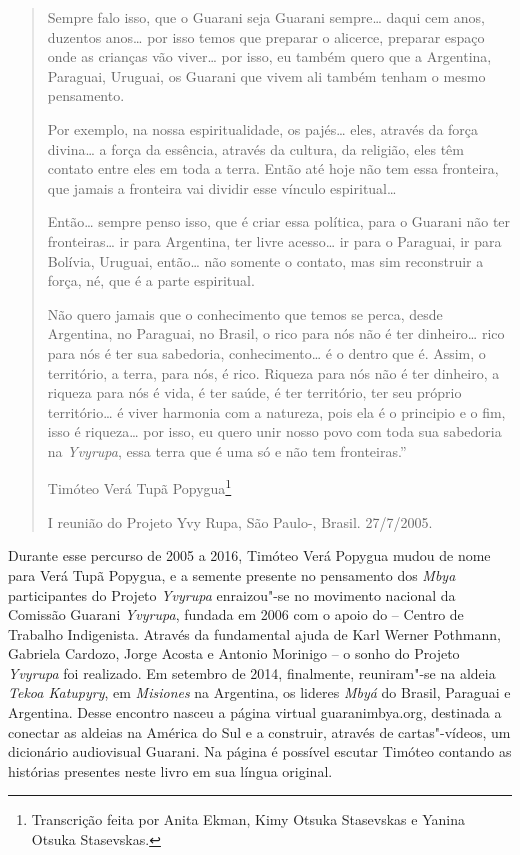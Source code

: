 \begin{quote}
Sempre falo isso, que o Guarani seja Guarani sempre… daqui cem
anos, duzentos anos… por isso temos que preparar o alicerce,
preparar espaço onde as crianças vão viver… por isso, eu também
quero que a Argentina, Paraguai, Uruguai, os Guarani que vivem ali
também tenham o mesmo pensamento.

Por exemplo, na nossa espiritualidade, os pajés… eles, através da
força divina… a força da essência, através da cultura, da
religião, eles têm contato entre eles em toda a terra. Então até hoje
não tem essa fronteira, que jamais a fronteira vai dividir esse vínculo
espiritual…

Então… sempre penso isso, que é criar essa política, para o
Guarani não ter fronteiras… ir para Argentina, ter livre
acesso… ir para o Paraguai, ir para Bolívia, Uruguai,
então… não somente o contato, mas sim reconstruir a força, né,
que é a parte espiritual.

Não quero jamais que o conhecimento que temos se perca, desde Argentina,
no Paraguai, no Brasil, o rico para nós não é ter dinheiro… rico
para nós é ter sua sabedoria, conhecimento… é o dentro que é.
Assim, o território, a terra, para nós, é rico. Riqueza para nós não é
ter dinheiro, a riqueza para nós é vida, é ter saúde, é ter território,
ter seu próprio território… é viver harmonia com a natureza, pois
ela é o principio e o fim, isso é riqueza… por isso, eu quero
unir nosso povo com toda sua sabedoria na \emph{Yvyrupa}, essa terra que
é uma só e não tem fronteiras.''

\medskip 
\hfill Timóteo Verá Tupã Popygua\footnote{ Transcrição feita por Anita Ekman, Kimy Otsuka Stasevskas e Yanina
Otsuka Stasevskas.}\smallskip 

\hfill \begin{minipage}{.6\textwidth}\footnotesize
I reunião do {Projeto Yvy Rupa}, São Paulo-,
Brasil. 27/7/2005. 
\end{minipage}

\end{quote}

 

Durante esse percurso de 2005 a 2016, Timóteo Verá Popygua mudou de nome
para Verá Tupã Popygua, e a semente presente no pensamento
dos \emph{Mbya} participantes
do {Projeto }\emph{{Yvyrupa}} enraizou"-se no movimento
nacional da {Comissão Guarani }\emph{{Yvyrupa}}, fundada
em 2006 com o apoio do { -- Centro de Trabalho Indigenista}.
Através da fundamental ajuda de Karl Werner Pothmann, Gabriela Cardozo,
Jorge Acosta e Antonio Morinigo -- o sonho
do {Projeto }\emph{{Yvyrupa}} foi realizado. Em setembro
de 2014, finalmente, reuniram"-se na aldeia \emph{Tekoa Katupyry},
em \emph{Misiones }na Argentina, os lideres \emph{Mbyá} do Brasil,
Paraguai e Argentina. Desse encontro nasceu a página
virtual guaranimbya.org, destinada a conectar as aldeias
na América do Sul e a construir, através de cartas"-vídeos, um dicionário
audiovisual Guarani. Na página é possível escutar Timóteo contando as
histórias presentes neste livro em sua língua original. 

